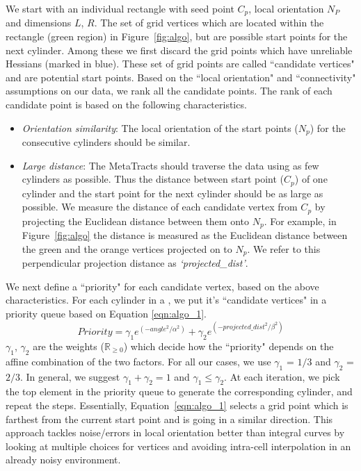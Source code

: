 We start with an individual rectangle with seed point $C_{p}$, local orientation $N_P$ and dimensions $L$, $R$. The set of grid vertices which are located within the rectangle (green region) in Figure~\ref{fig:algo}, but are possible start points for the next cylinder. Among these we first discard the grid points which have unreliable Hessians (marked in blue). These set of grid points are called ``candidate vertices" and are potential start points. Based on the ``local orientation" and ``connectivity" assumptions on our data, we rank all the candidate points. The rank of each candidate point is based on the following characteristics.
\begin{itemize}[noitemsep,nolistsep]
\item \textit{Orientation similarity}: The local orientation of the start points ($N_p$) for the consecutive cylinders should be similar. 
\item \textit{Large distance}: The MetaTracts should traverse the data using as few cylinders as possible. Thus the distance between start point ($C_p$) of one cylinder and the start point for the next cylinder should be as large as possible. We measure the distance of each candidate vertex from $C_p$ by projecting the Euclidean distance between them onto $N_p$. For example, in Figure~\ref{fig:algo} the distance is measured as the Euclidean distance between the green and the orange vertices projected on to $N_p$. We refer to this perpendicular projection distance as \textit{`projected\_dist'}. 
\end{itemize}

We next define a ``priority" for each candidate vertex, based on the above characteristics. For each cylinder in a \mt, we put it's ``candidate vertices" in a priority queue based on Equation \ref{eqn:algo_1}.
\begin{equation}
Priority = \gamma_1 e^{(-angle^2 / \alpha^2)} + \gamma_2e^{(-projected\_dist^2 / \beta^2)}
\label{eqn:algo_1}
\end{equation}
$\gamma_1$, $\gamma_2$ are the  weights ($\mathbb{R}_{\ge 0}$)  which decide how the ``priority" depends on the affine combination of the two factors. For all our cases, we use $\gamma_1$ = $1 / 3 $ and $\gamma_2$ = $2 / 3$. In general, we suggest $\gamma_1 +\gamma_2 = 1 $ and $\gamma_1 \leq \gamma_2$. At each iteration, we pick the top element in the priority queue to generate the corresponding cylinder, and repeat the steps. Essentially, Equation~\ref{eqn:algo_1} selects a grid point which is farthest from the current start point and is going in a similar direction. This approach tackles noise/errors in local orientation better than integral curves by looking at multiple choices for vertices and avoiding intra-cell interpolation in an already noisy environment. 

